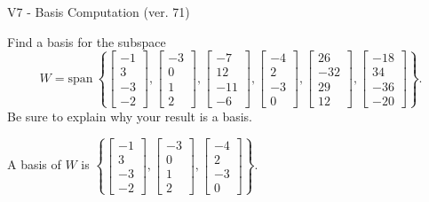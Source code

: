 \begin{exercise}
  \begin{exerciseTitle}V7 - Basis Computation (ver. 71)\end{exerciseTitle}
  \begin{exerciseStatement}
    Find a basis for the subspace 
\[W=\mathrm{span}\ \left\{\left[\begin{array}{r}
-1 \\
3 \\
-3 \\
-2
\end{array}\right] , \left[\begin{array}{r}
-3 \\
0 \\
1 \\
2
\end{array}\right] , \left[\begin{array}{r}
-7 \\
12 \\
-11 \\
-6
\end{array}\right] , \left[\begin{array}{r}
-4 \\
2 \\
-3 \\
0
\end{array}\right] , \left[\begin{array}{r}
26 \\
-32 \\
29 \\
12
\end{array}\right] , \left[\begin{array}{r}
-18 \\
34 \\
-36 \\
-20
\end{array}\right]\right\}.\]
 Be sure to explain why your result is a basis.


  \end{exerciseStatement}
  \begin{exerciseAnswer}
   A basis of \(W\) is  \(\left\{\left[\begin{array}{r}
-1 \\
3 \\
-3 \\
-2
\end{array}\right] , \left[\begin{array}{r}
-3 \\
0 \\
1 \\
2
\end{array}\right] , \left[\begin{array}{r}
-4 \\
2 \\
-3 \\
0
\end{array}\right]\right\}\).
  


  \end{exerciseAnswer}
\end{exercise}